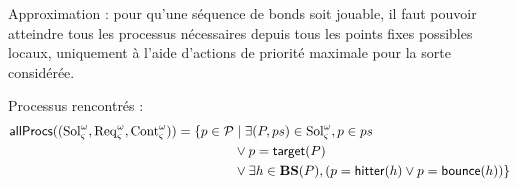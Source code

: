 

\newcommand{\abstr}[1]{#1^\wedge}%
\def\BS{\mathbf{BS}}
\def\procs{\mathsf{procs}}
\def\allprocs{\mathsf{allProcs}}
\def\pfp{\mathsf{pfp}}
\def\pfpprocs{\mathsf{pfpProcs}}

\def\ctx{\varsigma}
\def\w{\omega}
\def\aBS{\abstr{\BS}}

\def\Req{\mathrm{Req}}
\def\Sol{\mathrm{Sol}}
\def\Cont{\mathrm{Cont}}
\def\A{\mathcal{A}}
\def\cwA{\A_\ctx^\w}
\def\cwReq{\Req_\ctx^\w}
\def\cwSol{\Sol_\ctx^\w}
\def\cwCont{\Cont_\ctx^\w}

\def\aB{\mathcal{B}}
\def\sat#1{\lceil #1\rceil}
\def\cwB{\sat{\aB_\ctx^\w}}
\def\mycwB#1#2{\sat{\aB_{#1}^{#2}}}
\def\Bsol{\sat{\Sol^\w_\ctx}}
\def\Breq{\sat{\Req^\w_\ctx}}
\def\Bcont{\sat{\Cont^\w_\ctx}}

\def\myB{\aB^\w_\ctx}
\def\mysol{\overline{\Sol^\w_\ctx}}
\def\myreq{\overline{\Req^\w_\ctx}}
\def\mycont{\overline{\Cont^\w_\ctx}}


\def\PHobjp#1#2#3{\PHobj{{#1}_{#2}}{{#1}_{#3}}}
\def\Obj{\mathbf{Obj}}
\def\powerset{\wp}
\def\gCont{\f{maxCont}}
\def\w{\omega}

Approximation : pour qu'une séquence de bonds soit jouable, il faut pouvoir atteindre tous les processus nécessaires depuis tous les points fixes possibles locaux, uniquement à l'aide d'actions de priorité maximale pour la sorte considérée.





Processus rencontrés :
\begin{align*}
\allprocs((\cwSol,\cwReq,\cwCont)) = \{ p \in \PHproc &\mid \exists (P,ps) \in \cwSol, p \in ps
\\ & \vee p = \PHtarget(P)
\\ & \vee \exists h \in \BS(P), (p = \PHhitter(h) \vee p = \PHbounce(h)) \}
\end{align*}

